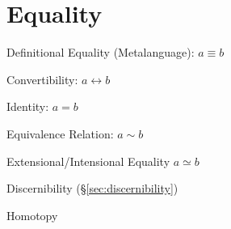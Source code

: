 \section{Equality}\label{sec:equality}\cite{baez15}

Definitional Equality (Metalanguage): $a \equiv b$

Convertibility: $a \leftrightarrow b$

Identity: $a = b$

Equivalence Relation: $a \sim b$

Extensional/Intensional Equality $a \simeq b$

Discernibility (\S\ref{sec:discernibility})

Homotopy



